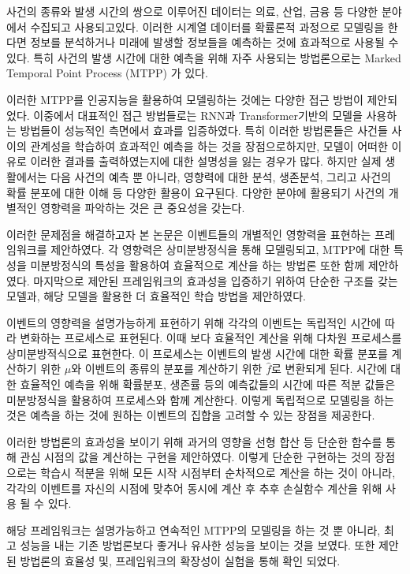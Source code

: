 사건의 종류와 발생 시간의 쌍으로 이루어진 데이터는 의료, 산업, 금융 등 다양한 분야에서 수집되고 사용되고있다.
이러한 시계열 데이터를 확률론적 과정으로 모델링을 한다면 정보를 분석하거나 미래에 발생할 정보들을 예측하는 것에 효과적으로 사용될 수 있다.
특히 사건의 발생 시간에 대한 예측을 위해 자주 사용되는 방법론으로는 Marked Temporal Point Process (MTPP) 가 있다.

이러한 MTPP를 인공지능을 활용하여 모델링하는 것에는 다양한 접근 방법이 제안되었다.
이중에서 대표적인 접근 방법들로는 RNN과 Transformer기반의 모델을 사용하는 방법들이 성능적인 측면에서 효과를 입증하였다.
특히 이러한 방법론들은 사건들 사이의 관계성을 학습하여 효과적인 예측을 하는 것을 장점으로하지만, 
모델이 어떠한 이유로 이러한 결과를 출력하였는지에 대한 설명성을 잃는 경우가 많다.
하지만 실제 생활에서는 다음 사건의 예측 뿐 아니라, 영향력에 대한 분석, 생존분석, 그리고 사건의 확률 분포에 대한 이해 등 다양한 활용이 요구된다.
다양한 분야에 활용되기 사건의 개별적인 영향력을 파악하는 것은 큰 중요성을 갖는다.

이러한 문제점을 해결하고자 본 논문은 이벤트들의 개별적인 영향력을 표현하는 프레임워크를 제안하였다.
각 영향력은 상미분방정식을 통해 모델링되고, MTPP에 대한 특성을 미분방정식의 특성을 활용하여 효율적으로 계산을 하는 방법론 또한 함께 제안하였다.
마지막으로 제안된 프레임워크의 효과성을 입증하기 위하여 단순한 구조를 갖는 모델과, 해당 모델을 활용한 더 효율적인 학습 방법을 제안하였다.

이벤트의 영향력을 설명가능하게 표현하기 위해 각각의 이벤트는 독립적인 시간에 따라 변화하는 프로세스로 표현된다.
이때 보다 효율적인 계산을 위해 다차원 프로세스를 상미분방적식으로 표현한다.
이 프로세스는 이벤트의 발생 시간에 대한 확률 분포를 계산하기 위한 $\mu$와 이벤트의 종류의 분포를 계산하기 위한 $\hat{f}$로 변환되게 된다.
시간에 대한 효율적인 예측을 위해 확률분포, 생존률 등의 예측값들의 시간에 따른 적분 값들은 미분방정식을 활용하여 프로세스와 함께 계산한다.
이렇게 독립적으로 모델링을 하는 것은 예측을 하는 것에 원하는 이벤트의 집합을 고려할 수 있는 장점을 제공한다.

이러한 방법론의 효과성을 보이기 위해 과거의 영향을 선형 합산 등 단순한 함수를 통해 관심 시점의 값을 계산하는 구현을 제안하였다.
이렇게 단순한 구현하는 것의 장점으로는 학습시 적분을 위해 모든 시작 시점부터 순차적으로 계산을 하는 것이 아니라, 
각각의 이벤트를 자신의 시점에 맞추어 동시에 계산 후 추후 손실함수 계산을 위해 사용 될 수 있다.

해당 프레임워크는 설명가능하고 연속적인 MTPP의 모델링을 하는 것 뿐 아니라, 
최고 성능을 내는 기존 방법론보다 좋거나 유사한 성능을 보이는 것을 보였다.
또한 제안된 방법론의 효율성 및, 프레임워크의 확장성이 실험을 통해 확인 되었다.

\